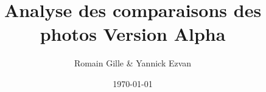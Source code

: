 



\title{Analyse des comparaisons des photos Version Alpha}
\author{Romain Gille \& Yannick Ezvan}
\date{\today}
\maketitle
{
    \hypersetup{linkbordercolor=gray}
    \tableofcontents
}

\newpage

\newpage

\newpage

\newpage

\newpage

\newpage

\newpage

\newpage

\newpage

\newpage

\newpage

\newpage



